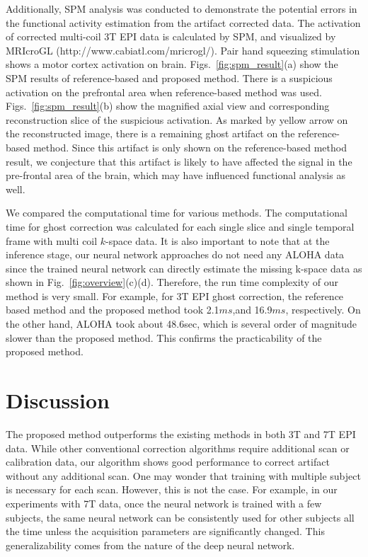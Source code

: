 \documentclass[num-refs]{wiley-article}
\newcommand{\0}{{\boldsymbol{0}}}
\newcommand{\1}{\blmath{1}}
\begin{document}
	Additionally,  SPM analysis was conducted to demonstrate the potential errors in the
	functional activity estimation from the artifact corrected data. The activation of corrected multi-coil 3T EPI data is calculated by SPM, and visualized by MRIcroGL (http://www.cabiatl.com/mricrogl/). Pair hand squeezing stimulation shows a motor cortex activation on brain. Figs.~\ref{fig:spm_result}(a)  show the SPM results of reference-based and proposed method. There is a suspicious activation on the prefrontal area when reference-based method was used. Figs.~\ref{fig:spm_result}(b) show  the magnified axial view and corresponding reconstruction slice of the suspicious activation. As marked by yellow arrow on the reconstructed image, there is a remaining ghost artifact on the reference-based method. Since this artifact is only shown on the reference-based method result, we conjecture that this artifact is likely to have affected the signal in the pre-frontal area of the brain, which may have influenced functional analysis as well.
	
	
	We compared the computational time for various methods. The computational time for ghost correction was calculated for each single slice and single temporal frame with multi coil $k$-space data.
	It is also important to note that at the inference stage, our neural network approaches do not need any ALOHA data since the trained neural network can directly estimate the missing k-space data as shown in Fig.~\ref{fig:overview}(c)(d). 
	Therefore, the run time complexity of our method is very small.
	For example, for 3T EPI ghost correction, the reference based method and the proposed method took 2.1$ms$,and 16.9$ms$, respectively. On the other hand, ALOHA took about 48.6sec, which is several order of magnitude slower than the proposed method. This confirms the practicability of the proposed method.
	
	
	
	\section{Discussion}  
	
	The proposed method outperforms the existing methods in both 3T and 7T EPI data.  While other conventional correction algorithms require additional scan or calibration data, our algorithm shows good performance to correct artifact without any additional scan. 
	One may wonder that training with multiple subject is necessary for each scan. However, this is not the case. For example, in our experiments with 7T data, once the neural network is trained with a few subjects, the same neural network can be consistently used for other subjects all the time unless the acquisition parameters are significantly changed.  This generalizability comes from the nature of the deep neural network.
	
\end{document}
